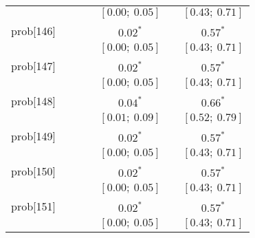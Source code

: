 \begin{table}
\begin{center}
\begin{tabular}{l c c c c c c }
          &                           &                           &                           & $[0.00;\ 0.05]$         &                           & $[0.43;\ 0.71]$       \\
prob[146] &                           &                           &                           & $0.02^{*}$              &                           & $0.57^{*}$            \\
          &                           &                           &                           & $[0.00;\ 0.05]$         &                           & $[0.43;\ 0.71]$       \\
prob[147] &                           &                           &                           & $0.02^{*}$              &                           & $0.57^{*}$            \\
          &                           &                           &                           & $[0.00;\ 0.05]$         &                           & $[0.43;\ 0.71]$       \\
prob[148] &                           &                           &                           & $0.04^{*}$              &                           & $0.66^{*}$            \\
          &                           &                           &                           & $[0.01;\ 0.09]$         &                           & $[0.52;\ 0.79]$       \\
prob[149] &                           &                           &                           & $0.02^{*}$              &                           & $0.57^{*}$            \\
          &                           &                           &                           & $[0.00;\ 0.05]$         &                           & $[0.43;\ 0.71]$       \\
prob[150] &                           &                           &                           & $0.02^{*}$              &                           & $0.57^{*}$            \\
          &                           &                           &                           & $[0.00;\ 0.05]$         &                           & $[0.43;\ 0.71]$       \\
prob[151] &                           &                           &                           & $0.02^{*}$              &                           & $0.57^{*}$            \\
          &                           &                           &                           & $[0.00;\ 0.05]$         &                           & $[0.43;\ 0.71]$       \\

\end{tabular}
\end{center}
\end{table}
